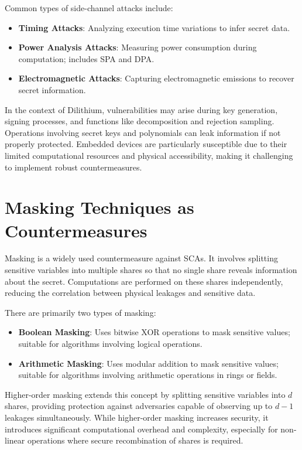 Common types of side-channel attacks include:

\begin{itemize}
    \item \textbf{Timing Attacks}: Analyzing execution time variations to infer secret data.
    \item \textbf{Power Analysis Attacks}: Measuring power consumption during computation; includes \ac{SPA} and \ac{DPA}.
    \item \textbf{Electromagnetic Attacks}: Capturing electromagnetic emissions to recover secret information.
\end{itemize}

In the context of Dilithium, vulnerabilities may arise during key generation, signing processes, and functions like decomposition and rejection sampling. Operations involving secret keys and polynomials can leak information if not properly protected. Embedded devices are particularly susceptible due to their limited computational resources and physical accessibility, making it challenging to implement robust countermeasures.

\section{Masking Techniques as Countermeasures}

Masking is a widely used countermeasure against SCAs. It involves splitting sensitive variables into multiple shares so that no single share reveals information about the secret. Computations are performed on these shares independently, reducing the correlation between physical leakages and sensitive data.

There are primarily two types of masking:

\begin{itemize}
    \item \textbf{Boolean Masking}: Uses bitwise XOR operations to mask sensitive values; suitable for algorithms involving logical operations.
    \item \textbf{Arithmetic Masking}: Uses modular addition to mask sensitive values; suitable for algorithms involving arithmetic operations in rings or fields.
\end{itemize}

Higher-order masking extends this concept by splitting sensitive variables into $d$ shares, providing protection against adversaries capable of observing up to $d - 1$ leakages simultaneously. While higher-order masking increases security, it introduces significant computational overhead and complexity, especially for non-linear operations where secure recombination of shares is required.

